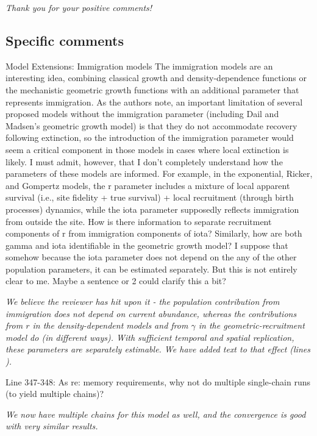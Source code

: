 \documentclass[12pt,english]{article}
\begin{document}
\begin{spacing}{1.9}
\begin{flushleft}
\vspace{0.5cm}
\textit{Thank you for your positive comments!}
\vspace{0.5cm}

\subsection*{Specific comments} 
Model Extensions: Immigration models 
The immigration models are an interesting idea, combining classical growth and
density-dependence functions or the mechanistic geometric growth functions with
an additional parameter that represents immigration. As the authors note, an
important limitation of several proposed models without the immigration
parameter (including Dail and Madsen's geometric growth model) is that they do
not accommodate recovery following extinction, so the introduction of the
immigration parameter would seem a critical component in those models in cases
where local extinction is likely. I must admit, however, that I don't completely
understand how the parameters of these models are informed. For example, in the
exponential, Ricker, and Gompertz models, the r parameter includes a mixture of
local apparent survival (i.e., site fidelity + true survival) + local
recruitment (through birth processes) dynamics, while the iota parameter
supposedly reflects immigration from outside the site. How is there
information to separate recruitment components of r from immigration components
of iota? Similarly, how are both gamma and iota identifiable in the geometric
growth model? I suppose that somehow because the iota parameter does not depend
on the any of the other population parameters, it can be estimated separately.
But this is not entirely clear to me. Maybe a sentence or 2 could clarify this a
bit?

\vspace{0.5cm}
\textit{We believe the reviewer has hit upon it - the population contribution from immigration
does not depend on current abundance, whereas the contributions from $r$ in the density-dependent
models and from $\gamma$ in the geometric-recruitment model do (in different ways).  With sufficient
temporal and spatial replication, these parameters are separately estimable.  We have added text to that
effect (lines ).}
\vspace{0.5cm}

Line 347-348: As re: memory requirements, why not do multiple single-chain runs
(to yield multiple chains)?

\vspace{0.5cm}
\textit{We now have multiple chains for this model as well, and the convergence is good
with very similar results.}
\vspace{0.5cm}


\end{flushleft}
\end{spacing}
\end{document}
